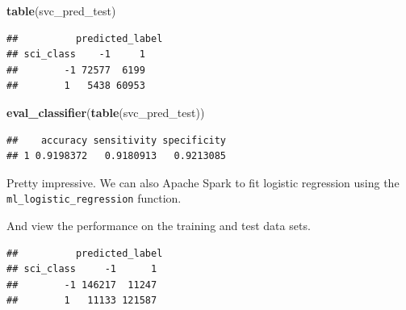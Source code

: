 \documentclass[]{book}
\newenvironment{Shaded}{\begin{snugshade}}{\end{snugshade}}
\newcommand{\CommentTok}[1]{\textcolor[rgb]{0.56,0.35,0.01}{\textit{#1}}}
\newcommand{\KeywordTok}[1]{\textcolor[rgb]{0.13,0.29,0.53}{\textbf{#1}}}
\newcommand{\NormalTok}[1]{#1}
\newcommand{\OperatorTok}[1]{\textcolor[rgb]{0.81,0.36,0.00}{\textbf{#1}}}
\newcommand{\StringTok}[1]{\textcolor[rgb]{0.31,0.60,0.02}{#1}}
\begin{document}
\begin{Shaded}
\begin{Highlighting}[]
\KeywordTok{table}\NormalTok{(svc_pred_test)}
\end{Highlighting}
\end{Shaded}

\begin{verbatim}
##          predicted_label
## sci_class    -1     1
##        -1 72577  6199
##        1   5438 60953
\end{verbatim}

\begin{Shaded}
\begin{Highlighting}[]
\KeywordTok{eval_classifier}\NormalTok{(}\KeywordTok{table}\NormalTok{(svc_pred_test))}
\end{Highlighting}
\end{Shaded}

\begin{verbatim}
##    accuracy sensitivity specificity
## 1 0.9198372   0.9180913   0.9213085
\end{verbatim}

Pretty impressive. We can also Apache Spark to fit logistic regression using the \texttt{ml\_logistic\_regression} function.

\begin{Shaded}
\end{Shaded}

And view the performance on the training and test data sets.

\begin{Shaded}
\end{Shaded}

\begin{verbatim}
##          predicted_label
## sci_class     -1      1
##        -1 146217  11247
##        1   11133 121587
\end{verbatim}
\end{document}
